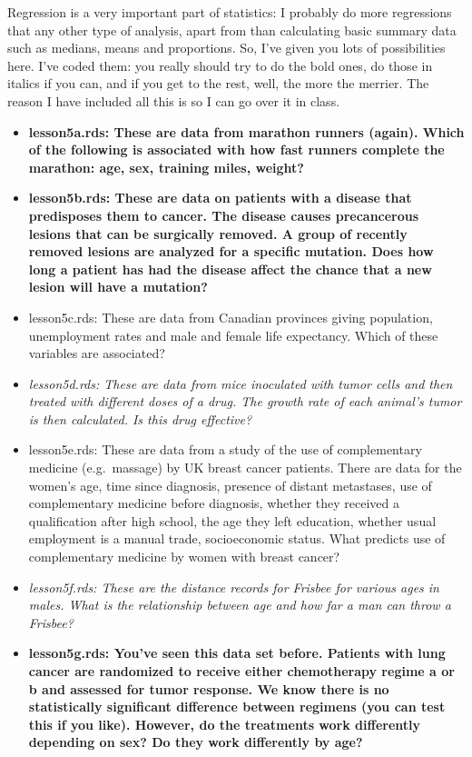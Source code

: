 \documentclass[]{book}
\begin{document}
Regression is a very important part of statistics: I probably do more regressions that any other type of analysis, apart from than calculating basic summary data such as medians, means and proportions. So, I've given you lots of possibilities here. I've coded them: you really should try to do the bold ones, do those in italics if you can, and if you get to the rest, well, the more the merrier. The reason I have included all this is so I can go over it in class.

\begin{itemize}
\item
  \textbf{lesson5a.rds: These are data from marathon runners (again). Which of the following is associated with how fast runners complete the marathon: age, sex, training miles, weight?}
\item
  \textbf{lesson5b.rds: These are data on patients with a disease that predisposes them to cancer. The disease causes precancerous lesions that can be surgically removed. A group of recently removed lesions are analyzed for a specific mutation. Does how long a patient has had the disease affect the chance that a new lesion will have a mutation?}
\item
  lesson5c.rds: These are data from Canadian provinces giving population, unemployment rates and male and female life expectancy. Which of these variables are associated?
\item
  \emph{lesson5d.rds: These are data from mice inoculated with tumor cells and then treated with different doses of a drug. The growth rate of each animal's tumor is then calculated. Is this drug effective?}
\item
  lesson5e.rds: These are data from a study of the use of complementary medicine (e.g.~massage) by UK breast cancer patients. There are data for the women's age, time since diagnosis, presence of distant metastases, use of complementary medicine before diagnosis, whether they received a qualification after high school, the age they left education, whether usual employment is a manual trade, socioeconomic status. What predicts use of complementary medicine by women with breast cancer?
\item
  \emph{lesson5f.rds: These are the distance records for Frisbee for various ages in males. What is the relationship between age and how far a man can throw a Frisbee?}
\item
  \textbf{lesson5g.rds: You've seen this data set before. Patients with lung cancer are randomized to receive either chemotherapy regime a or b and assessed for tumor response. We know there is no statistically significant difference between regimens (you can test this if you like). However, do the treatments work differently depending on sex? Do they work differently by age?}

\end{itemize}
\end{document}
